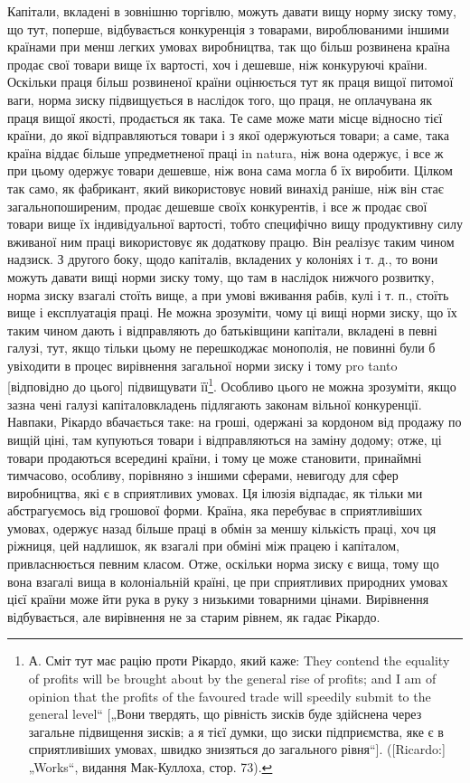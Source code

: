 Капітали, вкладені в зовнішню торгівлю, можуть давати вищу норму зиску тому, що тут, поперше,
відбувається конкуренція з товарами, вироблюваними іншими країнами при менш легких умовах
виробництва, так що більш розвинена країна продає свої
товари вище їх вартості, хоч і дешевше, ніж конкуруючі країни. Оскільки праця більш розвиненої
країни оцінюється тут як праця вищої питомої ваги, норма зиску підвищується в наслідок того, що
праця, не оплачувана як праця вищої якості, продається як така. Те саме може мати місце відносно
тієї країни, до якої відправляються товари і з якої одержуються товари; а саме, така країна віддає
більше упредметненої праці in natura, ніж вона одержує, і все ж при цьому одержує товари дешевше,
ніж вона сама могла б їх виробити. Цілком так само, як фабрикант,
який використовує новий винахід раніше, ніж він стає загальнопоширеним, продає дешевше своїх
конкурентів, і все ж продає свої товари вище їх індивідуальної вартості, тобто специфічно вищу
продуктивну силу вживаної ним праці використовує як додаткову працю. Він реалізує таким чином
надзиск. З другого боку, щодо капіталів, вкладених у колоніях і т. д., то вони можуть давати вищі
норми зиску тому, що там в наслідок нижчого розвитку, норма зиску взагалі стоїть вище, а при умові
вживання рабів, кулі і т. п., стоїть вище і експлуатація праці. Не можна зрозуміти, чому ці вищі
норми зиску, що їх таким чином дають і відправляють до батьківщини капітали, вкладені в певні
галузі, тут, якщо тільки цьому не перешкоджає монополія, не повинні були б увіходити в процес
вирівнення загальної норми зиску і тому pro tanto [відповідно до цього] підвищувати її\footnote{
А. Сміт тут має рацію проти Рікардо, який каже: They contend the equality of profits will be
brought about by the general rise of profits; and I am of opinion that the profits of the favoured
trade will speedily submit to the general level“ [„Вони твердять, що рівність зисків буде здійснена
через загальне підвищення зисків; а я тієї думки, що зиски підприємства, яке є в сприятливіших
умовах, швидко знизяться до загального рівня“]. ([Ricardo:] „Works“, видання Мак-Куллоха, стор. 73).
}. Особливо
цього не можна зрозуміти, якщо зазна
чені галузі капіталовкладень підлягають законам вільної конкуренції. Навпаки, Рікардо вбачається
таке: на гроші, одержані за кордоном від продажу по вищій ціні, там купуються товари і
відправляються на заміну додому; отже, ці товари продаються
всередині країни, і тому це може становити, принаймні тимчасово, особливу, порівняно з іншими
сферами, невигоду для сфер виробництва, які є в сприятливих умовах. Ця ілюзія відпадає, як тільки ми
абстрагуємось від грошової форми. Країна,
яка перебуває в сприятливіших умовах, одержує назад більше праці в обмін за меншу кількість праці,
хоч ця ріжниця, цей надлишок, як взагалі при обміні між працею і капіталом, привласнюється певним
класом. Отже, оскільки норма зиску є вища, тому
що вона взагалі вища в колоніальній країні, це при сприятливих природних умовах цієї країни може йти
рука в руку з низькими товарними цінами. Вирівнення відбувається, але вирівнення не за старим
рівнем, як гадає Рікардо.

